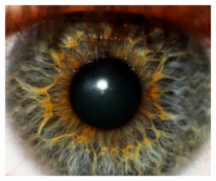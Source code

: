 \documentclass{article}
\begin{document}
\begin{figure}[H]
\begin{subfigure}{.09\textwidth}
  \label{fig:arrow}
\end{subfigure}%
\begin{subfigure}{.47\textwidth}
  \centering
  \includegraphics[width=0.97\linewidth]{_Figures/raw_data_3_lowpass.png}
  \caption{}
  \label{fig:raw_3_lowpass}
\end{subfigure}





\end{figure}
\end{document}
